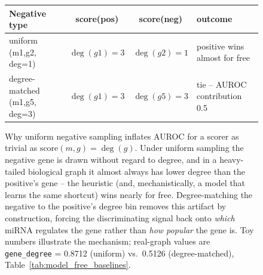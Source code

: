 \documentclass{bmcart}
\begin{document}
\begin{figure}[h!]
\centering
{}
\vspace{0.3em}

\small
\begin{tabular}{lccl}
\hline
Negative type & score(pos) & score(neg) & outcome \\
\hline
uniform (m1,g2, deg=1) & $\deg(g1){=}3$ & $\deg(g2){=}1$ & positive wins almost for free \\
degree-matched (m1,g5, deg=3) & $\deg(g1){=}3$ & $\deg(g5){=}3$ & tie -- AUROC contribution 0.5 \\
\hline
\end{tabular}
\caption{Why uniform negative sampling inflates AUROC for a scorer as trivial as
$\mathrm{score}(m,g)=\deg(g)$. Under uniform sampling the negative gene is drawn without
regard to degree, and in a heavy-tailed biological graph it almost always has lower
degree than the positive's gene -- the heuristic (and, mechanistically, a model that
learns the same shortcut) wins nearly for free. Degree-matching the negative to the
positive's degree bin removes this artifact by construction, forcing the discriminating
signal back onto \emph{which} miRNA regulates the gene rather than \emph{how popular}
the gene is. Toy numbers illustrate the mechanism; real-graph values are
\texttt{gene\_degree} = 0.8712 (uniform) vs.\ 0.5126 (degree-matched), Table~\ref{tab:model_free_baselines}.}
\label{fig:neg_sampling_mechanism}
\end{figure}
\end{document}
